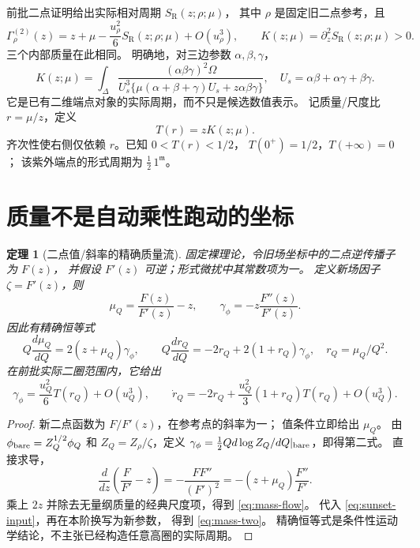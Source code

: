 \documentclass[11pt,a4paper]{ctexart}
\theoremstyle{cnplain}
\newtheorem{theorem}{定理}[section]
\theoremstyle{remark}\newtheorem{remark}[theorem]{注}
\newcommand{\SR}{S_{\mathrm R}}
\newcommand{\gphi}{\gamma_\phi}
\begin{document}
前批二点证明给出实际相对周期 $\SR(z;\rho;\mu)$，
其中 $\rho$ 是固定旧二点参考，且
\begin{equation}\label{eq:sunset-input}
 \Gamma_\rho^{(2)}(z)
 =z+\mu-\frac{u_\rho^2}{6}\SR(z;\rho;\mu)+O(u_\rho^3),
 \qquad
 K(z;\mu)=\partial_z^2\SR(z;\rho;\mu)>0.
\end{equation}
三个内部质量在此相同。
明确地，对三边参数 $\alpha,\beta,\gamma$，
\begin{equation}\label{eq:K}
 K(z;\mu)=\int_\Delta
 \frac{(\alpha\beta\gamma)^2\Omega}
 {U_s^3\{\mu(\alpha+\beta+\gamma)U_s+z\alpha\beta\gamma\}},
 \quad U_s=\alpha\beta+\alpha\gamma+\beta\gamma.
\end{equation}
它是已有二维端点对象的实际周期，而不只是候选数值表示。
记质量/尺度比 $r=\mu/z$，定义
\begin{equation}\label{eq:threshold-sunset}
 T(r)=zK(z;\mu).
\end{equation}
齐次性使右侧仅依赖 $r$。已知 $0<T(r)<1/2$，
$T(0^+)=1/2$，$T(+\infty)=0$；
该紫外端点的形式周期为 $\frac12\,1^{\mathfrak m}$。

\section{质量不是自动乘性跑动的坐标}\label{sec:mass}
\begin{theorem}[二点值/斜率的精确质量流]\label{thm:mass}
固定裸理论，令旧场坐标中的二点逆传播子为 $F(z)$，
并假设 $F'(z)$ 可逆；形式微扰中其常数项为一。
定义新场因子 $\zeta=F'(z)$，则
\begin{equation}\label{eq:mass-coordinate}
 \mu_Q=\frac{F(z)}{F'(z)}-z,\qquad
 \gphi=-z\frac{F''(z)}{F'(z)}.
\end{equation}
因此有精确恒等式
\begin{equation}\label{eq:mass-flow}
 Q\frac{d\mu_Q}{dQ}=2(z+\mu_Q)\gphi,\qquad
 Q\frac{dr_Q}{dQ}=-2r_Q+2(1+r_Q)\gphi,
 \quad r_Q=\mu_Q/Q^2.
\end{equation}
在前批实际二圈范围内，它给出
\begin{equation}\label{eq:mass-two}
 \gphi=\frac{u_Q^2}{6}T(r_Q)+O(u_Q^3),\qquad
 \dot r_Q=-2r_Q+\frac{u_Q^2}{3}(1+r_Q)T(r_Q)+O(u_Q^3).
\end{equation}
\end{theorem}
\begin{proof}
新二点函数为 $F/F'(z)$，在参考点的斜率为一；
值条件立即给出 $\mu_Q$。
由 $\phi_{\rm bare}=Z_Q^{1/2}\phi_Q$ 和
$Z_Q=Z_\rho/\zeta$，定义
$\gphi=\frac12Qd\log Z_Q/dQ|_{\rm bare}$，即得第二式。
直接求导，
\[
 \frac{d}{dz}\left(\frac F{F'}-z\right)
 =-\frac{FF''}{(F')^2}
 =-(z+\mu_Q)\frac{F''}{F'}.
\]
乘上 $2z$ 并除去无量纲质量的经典尺度项，得到
\eqref{eq:mass-flow}。
代入 \eqref{eq:sunset-input}，再在本阶换写为新参数，
得到 \eqref{eq:mass-two}。
精确恒等式是条件性运动学结论，不主张已经构造任意高圈的实际周期。
\end{proof}
\end{document}
